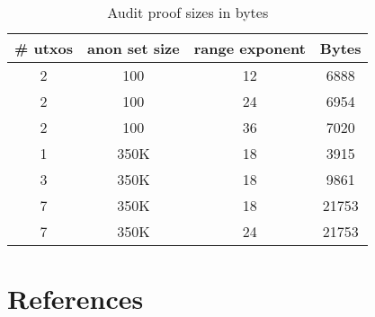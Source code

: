 \documentclass[10pt,a4paper]{article}
\begin{document}
\begin{table}[ht]
\caption{Audit proof sizes in bytes}
\centering
\begin{tabular}{c c c c}
\hline\hline
\# utxos & anon set size & range exponent & Bytes \\ [0.5ex]
\hline
2 & 100 & 12 & 6888 \\
2 & 100 & 24 & 6954 \\
2 & 100 & 36 & 7020 \\
1 & 350K & 18 & 3915 \\
3 & 350K & 18 & 9861 \\
7 & 350K & 18 & 21753 \\
7 & 350K & 24 & 21753 \\ [1ex] %
\hline
\end{tabular}
\label{table:prfsize}
\end{table}


\pagebreak

\hypertarget{references}{%
\section[References]{\texorpdfstring{\protect\hypertarget{anchor-77}{}{}References}{References}}\label{references}}
\end{document}

